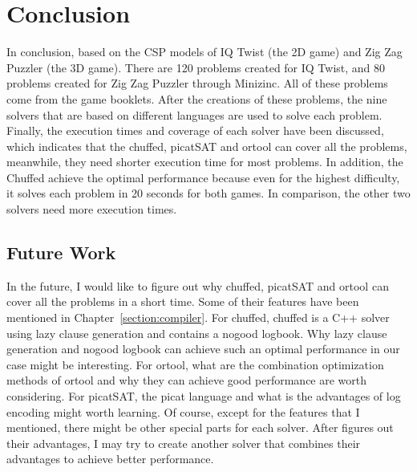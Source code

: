 \chapter{Conclusion}
\label{cha:conc}
In conclusion, based on the CSP models of IQ Twist (the 2D game) and Zig Zag Puzzler (the 3D game). There are 120 problems created for IQ Twist, and 80 problems created for Zig Zag Puzzler through Minizinc. All of these problems come from the game booklets. After the creations of these problems, the nine solvers that are based on different languages are used to solve each problem. Finally, the execution times and coverage of each solver have been discussed, which indicates that the chuffed, picatSAT and ortool can cover all the problems, meanwhile, they need shorter execution time for most problems. In addition, the Chuffed achieve the optimal performance because even for the highest difficulty, it solves each problem in 20 seconds for both games. In comparison, the other two solvers need more execution times.
\section{Future Work}
\label{sec:future}
In the future, I would like to figure out why chuffed, picatSAT and ortool can cover all the problems in a short time. Some of their features have been mentioned in Chapter~\ref{section:compiler}. 
For chuffed,  chuffed is a C++ solver using lazy clause generation and contains a nogood logbook. Why lazy clause generation and nogood logbook can achieve such an optimal performance in our case might be interesting. 
For ortool, what are the combination optimization methods of ortool and why they can achieve good performance are worth considering.
For picatSAT, the picat language and what is the advantages of log encoding might worth learning.
Of course, except for the features that I mentioned, there might be other special parts for each solver. After figures out their advantages, I may try to create another solver that combines their advantages to achieve better performance.



